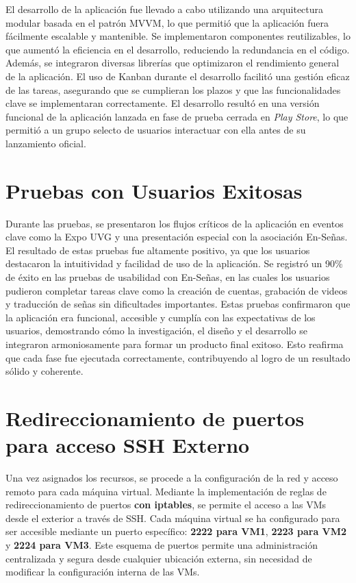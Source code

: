     El desarrollo de la aplicación fue llevado a cabo utilizando una arquitectura modular basada en el patrón MVVM, lo que permitió que la aplicación fuera fácilmente escalable y mantenible. Se implementaron componentes reutilizables, lo que aumentó la eficiencia en el desarrollo, reduciendo la redundancia en el código. Además, se integraron diversas librerías que optimizaron el rendimiento general de la aplicación. El uso de Kanban durante el desarrollo facilitó una gestión eficaz de las tareas, asegurando que se cumplieran los plazos y que las funcionalidades clave se implementaran correctamente. El desarrollo resultó en una versión funcional de la aplicación lanzada en fase de prueba cerrada en \textit{Play Store}, lo que permitió a un grupo selecto de usuarios interactuar con ella antes de su lanzamiento oficial. 


    \section{Pruebas con Usuarios Exitosas}
    
    Durante las pruebas, se presentaron los flujos críticos de la aplicación en eventos clave como la Expo UVG y una presentación especial con la asociación En-Señas. El resultado de estas pruebas fue altamente positivo, ya que los usuarios destacaron la intuitividad y facilidad de uso de la aplicación. Se registró un 90\% de éxito en las pruebas de usabilidad con En-Señas, en las cuales los usuarios pudieron completar tareas clave como la creación de cuentas, grabación de videos y traducción de señas sin dificultades importantes. Estas pruebas confirmaron que la aplicación era funcional, accesible y cumplía con las expectativas de los usuarios, demostrando cómo la investigación, el diseño y el desarrollo se integraron armoniosamente para formar un producto final exitoso. Esto reafirma que cada fase fue ejecutada correctamente, contribuyendo al logro de un resultado sólido y coherente.
    

\section{Redireccionamiento de puertos para acceso SSH Externo}

Una vez asignados los recursos, se procede a la configuración de la red y acceso remoto para cada máquina virtual. Mediante la implementación de reglas de redireccionamiento de puertos \textbf{con iptables}, se permite el acceso a las VMs desde el exterior a través de SSH. Cada máquina virtual se ha configurado para ser accesible mediante un puerto específico: \textbf{2222 para VM1}, \textbf{2223 para VM2} y \textbf{2224 para VM3}. Este esquema de puertos permite una administración centralizada y segura desde cualquier ubicación externa, sin necesidad de modificar la configuración interna de las VMs.

